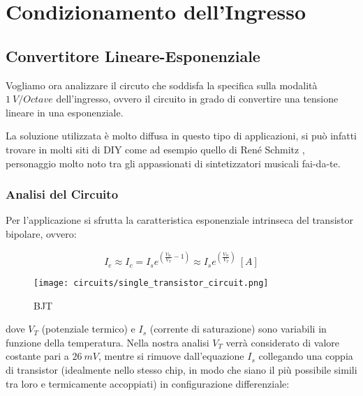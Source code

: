 \chapter{Condizionamento dell'Ingresso}


\section{Convertitore Lineare-Esponenziale}


Vogliamo ora analizzare il circuto che soddisfa la specifica sulla modalità $1\ V/Octave$
dell'ingresso, ovvero il circuito in grado di convertire una tensione lineare in una
esponenziale.

La soluzione utilizzata è molto diffusa in questo tipo di applicazioni, si può infatti
trovare in molti siti di DIY come ad esempio quello di René Schmitz \cite{expo_converter},
personaggio molto noto tra gli appassionati di sintetizzatori musicali fai-da-te.


\subsection*{Analisi del Circuito}


Per l'applicazione si sfrutta la caratteristica esponenziale intrinseca del transistor
bipolare, ovvero:

\begin{equation}\label{transistor_current}
    I_e\approx I_c=I_se^{\left(\frac{V_{be}}{V_T}-1\right)}
    \approx I_se^{\left(\frac{V_{be}}{V_T}\right)}\ [A]
\end{equation}

\begin{figure}[H]
    \centering
    \texttt{[image: circuits/single\_transistor\_circuit.png]}
    \caption{BJT}
    \label{bjt}
\end{figure}

dove $V_T$ (potenziale termico) e $I_s$ (corrente di saturazione) sono variabili in
funzione della temperatura. Nella nostra analisi $V_T$ verrà considerato di valore costante
pari a $26\ mV$, mentre si rimuove dall'equazione $I_s$ collegando una coppia di transistor
(idealmente nello stesso chip, in modo che siano il più possibile simili tra loro e
termicamente accoppiati) in configurazione differenziale:

